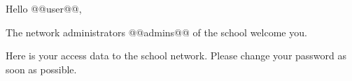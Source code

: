 Hello @@user@@,

\vspace{2mm}

The network administrators @@admins@@ of the school welcome you.

\vspace{2mm}

Here is your access data to the school network. Please change your
password as soon as possible.




